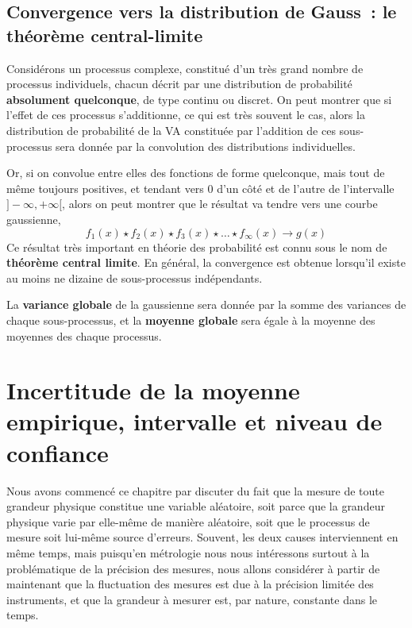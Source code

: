 \subsection{Convergence vers la distribution de Gauss~: le théorème central-limite}

Considérons un processus complexe, constitué d'un très grand nombre de processus individuels, chacun décrit par une distribution de probabilité \textbf{absolument quelconque}, de type continu ou discret. On peut montrer que si l'effet de ces processus s'additionne, ce qui est très souvent le cas, alors la distribution de probabilité de la VA constituée par l'addition de ces sous-processus sera donnée par la convolution des distributions individuelles.

Or, si on convolue entre elles des fonctions de forme quelconque, mais tout de même toujours positives, et tendant vers 0 d'un côté et de l'autre de l'intervalle $]-\infty,+\infty[$, alors on peut montrer que le résultat va tendre vers une courbe gaussienne,
\begin{equation}
f_1(x)\star f_2(x)\star f_3(x)\star\dots\star f_\infty(x)\rightarrow g(x)
\end{equation}
Ce résultat très important en théorie des probabilité est connu sous le nom de \textbf{théorème central limite}. En général, la convergence est obtenue lorsqu'il existe au moins ne dizaine de sous-processus indépendants.

La \textbf{variance globale} de la gaussienne sera donnée par la somme des variances de chaque sous-processus, et la \textbf{moyenne globale} sera égale à la moyenne des moyennes des chaque processus.

\section{Incertitude de la moyenne empirique, intervalle et niveau de confiance}

Nous avons commencé ce chapitre par discuter du fait que la mesure de toute grandeur physique constitue une variable aléatoire, soit parce que la grandeur physique varie par elle-même de manière aléatoire, soit que le processus de mesure soit lui-même source d'erreurs. Souvent, les deux causes interviennent en même temps, mais puisqu'en métrologie nous nous intéressons surtout à la problématique de la précision des mesures, nous allons considérer à partir de maintenant que la fluctuation des mesures est due à la précision limitée des instruments, et que la grandeur à mesurer est, par nature, constante dans le temps.

